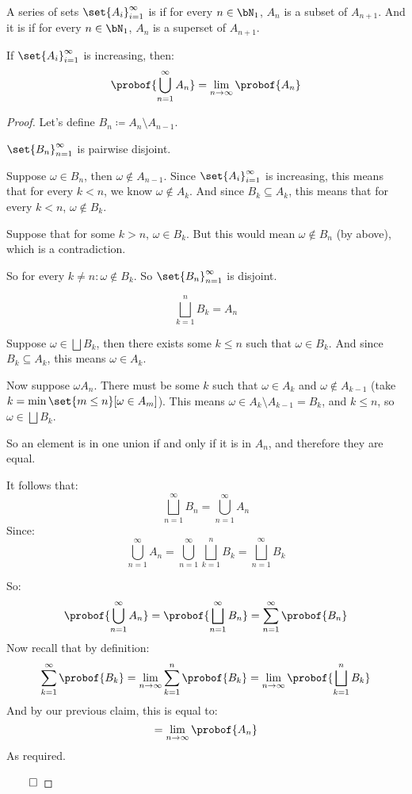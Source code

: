 \begin{defn*}

	A series of sets $\set{A_i}_{i=1}^\infty$ is  if for every $n\in\bN_1$, $A_n$ is a subset of $A_{n+1}$.
	And it is  if for every $n\in\bN_1$, $A_n$ is a superset of $A_{n+1}$.

\end{defn*}

\begin{thrm*}[contProbTheorem]

	If $\set{A_i}_{i=1}^\infty$ is increasing, then:
	\[ \probof{\bigcup_{n=1}^\infty A_n} = \lim_{n\to\infty}\probof{A_n} \]

\end{thrm*}

\begin{proof}

	Let's define $B_n\coloneqq A_n\setminus A_{n-1}$.

	\begin{claim}
		$\set{B_n}_{n=1}^\infty$ is pairwise disjoint.

		Suppose $\omega\in B_n$, then $\omega\notin A_{n-1}$.
		Since $\set{A_i}_{i=1}^\infty$ is increasing, this means that for every $k<n$, we know $\omega\notin A_k$.
		And since $B_k\subseteq A_k$, this means that for every $k<n$, $\omega\notin B_k$.

		Suppose that for some $k>n$, $\omega\in B_k$. But this would mean $\omega\notin B_n$ (by above), which is a contradiction.

		So for every $k\neq n: \omega\notin B_k$.
		So $\set{B_n}_{n=1}^\infty$ is disjoint.
	\end{claim}

	\begin{claim}
		\[ \bigsqcup_{k=1}^n B_k = A_n \]

		Suppose $\omega\in\bigsqcup B_k$, then there exists some $k\leq n$ such that $\omega\in B_k$.
		And since $B_k\subseteq A_k$, this means $\omega\in A_k$.

		Now suppose $\omega A_n$.
		There must be some $k$ such that $\omega\in A_k$ and $\omega\notin A_{k-1}$
		(take $k=\min\set{m\leq n}[\omega\in A_m]$).
		This means $\omega\in A_k\setminus A_{k-1}=B_k$, and $k\leq n$, so $\omega\in\bigsqcup B_k$.

		So an element is in one union if and only if it is in $A_n$, and therefore they are equal.
	\end{claim}

	It follows that:
	\[ \bigsqcup_{n=1}^\infty B_n = \bigcup_{n=1}^\infty A_n \]
	Since:
	\[ \bigcup_{n=1}^\infty A_n = \bigcup_{n=1}^\infty \bigsqcup_{k=1}^n B_k = \bigsqcup_{n=1}^\infty B_k \]

	So:
	\[ \probof{\bigcup_{n=1}^\infty A_n} = \probof{\bigsqcup_{n=1}^\infty B_n} = \sum_{n=1}^\infty \probof{B_n} \]
	Now recall that by definition:
	\[ \sum_{k=1}^\infty\probof{B_k} = \lim_{n\to\infty}\sum_{k=1}^n\probof{B_k} = \lim_{n\to\infty}\probof{\bigsqcup_{k=1}^n B_k} \]
	And by our previous claim, this is equal to:
	\[ = \lim_{n\to\infty}\probof{A_n} \]
	As required.

\hfill$\qed$

\end{proof}

